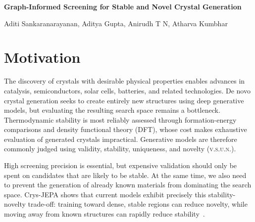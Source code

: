 \documentclass[10pt,a4paper]{article}
\newcommand{\vsun}{\textsc{v.s.u.n.}}
\newcommand{\sectionrule}{\vspace{-1.5pt}{\color{navy!35}\hrule height .35pt}\vspace{1.2pt}}
\begin{document}
\fontsize{9.6}{11.1}\selectfont

\begin{center}
  {\color{navy}\bfseries\fontsize{16.2}{18}\selectfont
  Graph-Informed Screening for Stable and Novel Crystal Generation}\par
  \vspace{2.5pt}
  {\large{Aditi Sankaranarayanan, Aditya Gupta, Anirudh T N, Atharva Kumbhar}}
\end{center}

\smallskip
\section*{Motivation}
\sectionrule
The discovery of crystals with desirable physical properties enables advances in catalysis, semiconductors, solar cells, batteries, and related technologies. De novo crystal generation seeks to create entirely new structures using deep generative models, but evaluating the resulting search space remains a bottleneck. Thermodynamic stability is most reliably assessed through formation-energy comparisons and density functional theory (DFT), whose cost makes exhaustive evaluation of generated crystals impractical. Generative models are therefore commonly judged using validity, stability, uniqueness, and novelty (\vsun).

High screening precision is essential, but expensive validation should only be spent on candidates that are likely to be stable. At the same time, we also need to prevent the generation of already known materials from dominating the search space. Crys-JEPA shows that current models exhibit precisely this stability-novelty trade-off: training toward dense, stable regions can reduce novelty, while moving away from known structures can rapidly reduce stability~\cite{liu2026crysjepa}.
\end{document}
